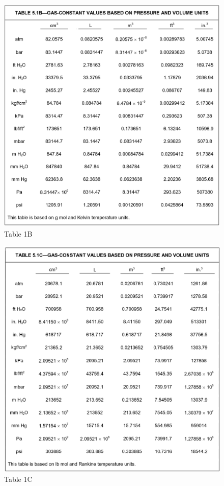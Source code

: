 \documentclass[16pt,a4paper]{article}
\begin{document}
\begin{figure}[!hbpt]
    \includegraphics[scale=1]{images/Vol_2.png}
    \caption{Table 1B}
    \label{fig:figure2}
\end{figure}
\begin{figure}[!hbpt]
    \includegraphics[scale=1]{images/Vol_3.png}
    \caption{Table 1C}
    \label{fig:figure3}
\end{figure}
\end{document}

